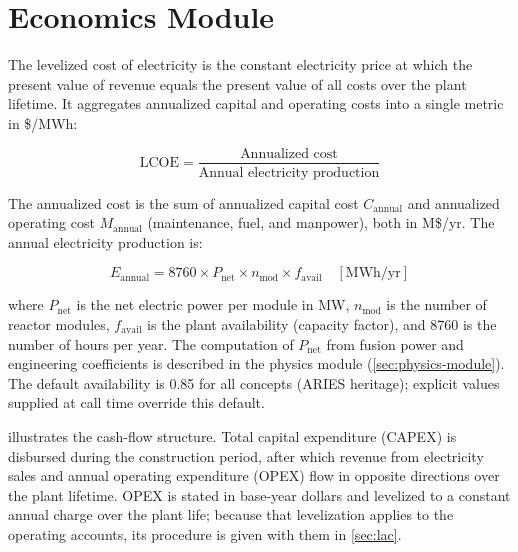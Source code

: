 \documentclass{article}
\begin{document}
\section{Economics Module}
\label{sec:lcoe}

The levelized cost of electricity is the constant electricity price at
which the present value of revenue equals the present value of all costs
over the plant lifetime. It aggregates annualized capital and operating
costs into a single metric in \$/MWh:

\begin{equation}
\label{eq:lcoe}
\text{LCOE} = \frac{\text{Annualized cost}}{\text{Annual electricity production}}
\end{equation}

\noindent The annualized cost is the sum of annualized capital cost
$C_{\text{annual}}$ and annualized operating cost $M_{\text{annual}}$
(maintenance, fuel, and manpower), both in M\$/yr. The annual electricity
production is:

\begin{equation}
\label{eq:e-annual}
E_{\text{annual}} = 8760 \times P_{\text{net}} \times n_{\text{mod}} \times f_{\text{avail}}
\quad [\text{MWh/yr}]
\end{equation}

\noindent where $P_{\text{net}}$ is the net electric power per module in MW,
$n_{\text{mod}}$ is the number of reactor modules, $f_{\text{avail}}$ is the plant
availability (capacity factor), and 8760 is the number of hours per year.
The computation of $P_{\text{net}}$ from fusion power and
engineering coefficients is described in the physics module
(\cref{sec:physics-module}).
The default availability is 0.85 for all concepts (ARIES heritage);
explicit values supplied at call time override this default.

 illustrates the cash-flow structure. Total capital
expenditure (CAPEX) is disbursed during the construction period, after
which revenue from electricity sales and annual operating expenditure
(OPEX) flow in opposite directions over the plant lifetime. OPEX is
stated in base-year dollars and levelized to a constant annual charge
over the plant life; because that levelization applies to the operating
accounts, its procedure is given with them in \cref{sec:lac}.
\end{document}
